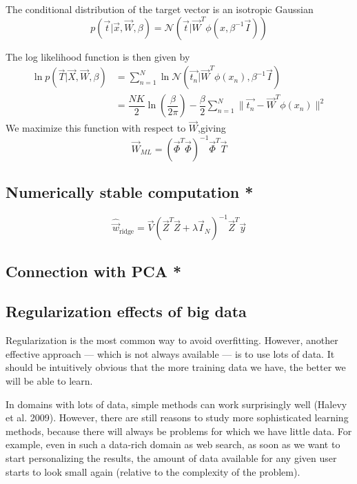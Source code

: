 The conditional distribution of the target vector is an isotropic Gaussian
\begin{equation}
p(\vec{t}|\vec{x},\vec{W},\beta) =
\mathcal{N}(\vec{t}|\vec{W}^T\phi(x,\beta^{-1}\vec{I}))
\end{equation}

The log likelihood function is then given by 
\begin{align}
\ln p(\vec{T}|\vec{X},\vec{W},\beta) 
&=\sum_{n=1}^{N}\ln \mathcal{N}(\vec{t_n}|\vec{W}^T\phi(x_n),\beta^{-1}\vec{I}) \\
&=\dfrac{NK}{2}\ln(\dfrac{\beta}{2\pi}) 
 -\dfrac{\beta}{2}\sum_{n=1}^{N}\parallel \vec{t_n}-\vec{W}^T\phi(x_n)\parallel^2
\end{align}
We maximize this function with respect to $\vec{W}$,giving
\begin{equation}
\vec{W}_{ML} = (\vec{\Phi}^T\vec{\Phi})^{-1}\vec{\Phi}^T\vec{T}
\end{equation}


\subsection{Numerically stable computation *}

\begin{equation}\label{eqn:Ridge-regression-SVD}
\hat{\vec{w}}_{\mathrm{ridge}}=\vec{V}(\vec{Z}^T\vec{Z}+\lambda\vec{I}_N)^{-1}\vec{Z}^T\vec{y}
\end{equation}


\subsection{Connection with PCA *}


\subsection{Regularization effects of big data}
Regularization is the most common way to avoid overfitting. However, another effective approach — which is not always available — is to use lots of data. It should be intuitively obvious that the more training data we have, the better we will be able to learn.

In domains with lots of data, simple methods can work surprisingly well (Halevy et al. 2009). However, there are still reasons to study more sophisticated learning methods, because there will always be problems for which we have little data. For example, even in such a data-rich domain as web search, as soon as we want to start personalizing the results, the amount of data available for any given user starts to look small again (relative to the complexity of the problem).

